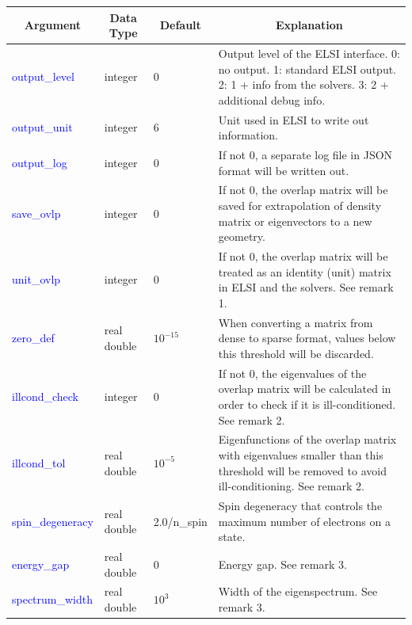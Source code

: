 \documentclass{report}
\begin{document}
\begin{tabular}[]{|p{30mm}|p{20mm}|p{15mm}|p{100mm}|}
\hline
\multicolumn{1}{|c|}{\textbf{Argument}} & \multicolumn{1}{c|}{\textbf{Data Type}} & \multicolumn{1}{c|}{\textbf{Default}} & \multicolumn{1}{c|}{\textbf{Explanation}}\\
\hline
\textcolor{blue}{output\_level}       & integer            & 0           & Output level of the ELSI interface.  0: no output.  1:  standard ELSI output.  2:  1 + info from the solvers.  3:  2 + additional debug info.\\
\hline
\textcolor{blue}{output\_unit}        & integer            & 6           & Unit used in ELSI to write out information.\\
\hline
\textcolor{blue}{output\_log}         & integer            & 0           & If not 0, a separate log file in JSON format will be written out.\\
\hline
\textcolor{blue}{save\_ovlp }         & integer            & 0           & If not 0, the overlap matrix will be saved for extrapolation of density matrix or eigenvectors to a new geometry.\\
\hline
\textcolor{blue}{unit\_ovlp }         & integer            & 0           & If not 0, the overlap matrix will be treated as an identity (unit) matrix in ELSI and the solvers.  See remark 1.\\
\hline
\textcolor{blue}{zero\_def }          & real double        & $10^{-15}$  & When converting a matrix from dense to sparse format, values below this threshold will be discarded.\\
\hline
\textcolor{blue}{illcond\_check}      & integer            & 0           & If not 0, the eigenvalues of the overlap matrix will be calculated in order to check if it is ill-conditioned.  See remark 2.\\
\hline
\textcolor{blue}{illcond\_tol}        & real double        & $10^{-5}$   & Eigenfunctions of the overlap matrix with eigenvalues smaller than this threshold will be removed to avoid ill-conditioning.  See remark 2.\\
\hline
\textcolor{blue}{spin\_degeneracy}    & real double        & 2.0/n\_spin & Spin degeneracy that controls the maximum number of electrons on a state.\\
\hline
\textcolor{blue}{energy\_gap}         & real double        & 0           & Energy gap.  See remark 3.\\
\hline
\textcolor{blue}{spectrum\_width}     & real double        & $10^{3}$    & Width of the eigenspectrum.  See remark 3.\\

\end{tabular}
\end{document}
